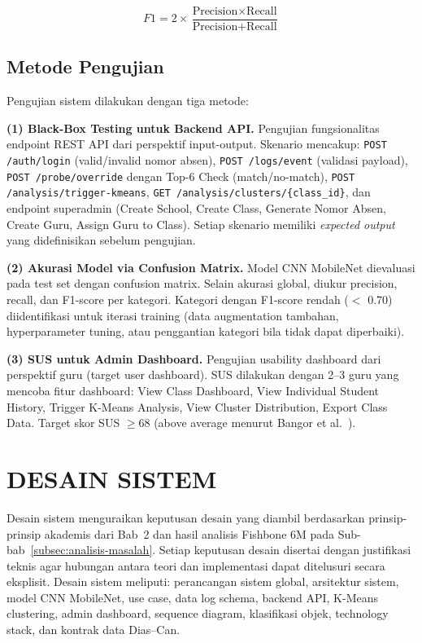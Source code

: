 \documentclass[12pt,a4paper,oneside,openany]{report}
\begin{document}
\begin{equation}
\label{eq:f1}
F1 = 2 \times \frac{\text{Precision} \times \text{Recall}}{\text{Precision} + \text{Recall}}
\end{equation}

\subsection{Metode Pengujian}
\label{subsec:metode-pengujian}

Pengujian sistem dilakukan dengan tiga metode:

\textbf{(1) Black-Box Testing untuk Backend API.} Pengujian fungsionalitas endpoint REST API dari perspektif input-output. Skenario mencakup: \texttt{POST /auth/login} (valid/invalid nomor absen), \texttt{POST /logs/event} (validasi payload), \texttt{POST /probe/override} dengan Top-6 Check (match/no-match), \texttt{POST /analysis/trigger-kmeans}, \texttt{GET /analysis/clusters/\{class\_id\}}, dan endpoint superadmin (Create School, Create Class, Generate Nomor Absen, Create Guru, Assign Guru to Class). Setiap skenario memiliki \textit{expected output} yang didefinisikan sebelum pengujian.

\textbf{(2) Akurasi Model via Confusion Matrix.} Model CNN MobileNet dievaluasi pada test set dengan confusion matrix. Selain akurasi global, diukur precision, recall, dan F1-score per kategori. Kategori dengan F1-score rendah ($<$ 0.70) diidentifikasi untuk iterasi training (data augmentation tambahan, hyperparameter tuning, atau penggantian kategori bila tidak dapat diperbaiki).

\textbf{(3) SUS untuk Admin Dashboard.} Pengujian usability dashboard dari perspektif guru (target user dashboard). SUS dilakukan dengan 2--3 guru yang mencoba fitur dashboard: View Class Dashboard, View Individual Student History, Trigger K-Means Analysis, View Cluster Distribution, Export Class Data. Target skor SUS $\geq 68$ (above average menurut Bangor et al.~\cite{ref16}).

\section{DESAIN SISTEM}
\label{sec:desain-sistem}

Desain sistem menguraikan keputusan desain yang diambil berdasarkan prinsip-prinsip akademis dari Bab~2 dan hasil analisis Fishbone 6M pada Sub-bab~\ref{subsec:analisis-masalah}. Setiap keputusan desain disertai dengan justifikasi teknis agar hubungan antara teori dan implementasi dapat ditelusuri secara eksplisit. Desain sistem meliputi: perancangan sistem global, arsitektur sistem, model CNN MobileNet, use case, data log schema, backend API, K-Means clustering, admin dashboard, sequence diagram, klasifikasi objek, technology stack, dan kontrak data Dias--Can.
\end{document}
